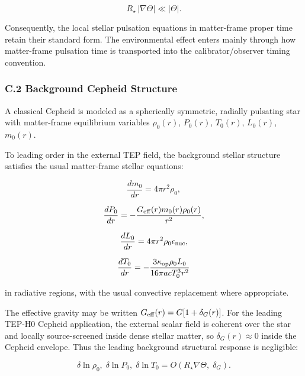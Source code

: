 \documentclass[
]{article}
\begin{document}
\begin{equation}
R_\star\,|\nabla\Theta| \ll |\Theta| .
\end{equation}

Consequently, the local stellar pulsation equations in matter-frame
proper time retain their standard form. The environmental effect enters
mainly through how matter-frame pulsation time is transported into the
calibrator/observer timing convention.

\subsubsection{C.2 Background Cepheid
Structure}\label{c.2-background-cepheid-structure}

A classical Cepheid is modeled as a spherically symmetric, radially
pulsating star with matter-frame equilibrium variables \(\rho_0(r)\),
\(P_0(r)\), \(T_0(r)\), \(L_0(r)\), \(m_0(r)\).

To leading order in the external TEP field, the background stellar
structure satisfies the usual matter-frame stellar equations:

\begin{equation}
\frac{dm_0}{dr} = 4\pi r^2\rho_0 ,
\end{equation}

\begin{equation}
\frac{dP_0}{dr} = -\frac{G_{\rm eff}(r)m_0(r)\rho_0(r)}{r^2} ,
\end{equation}

\begin{equation}
\frac{dL_0}{dr} = 4\pi r^2\rho_0\epsilon_{\rm nuc} ,
\end{equation}

\begin{equation}
\frac{dT_0}{dr} = -\frac{3\kappa_{\rm op}\rho_0 L_0}{16\pi a c T_0^3 r^2}
\end{equation}

in radiative regions, with the usual convective replacement where
appropriate.

The effective gravity may be written
\(G_{\rm eff}(r) = G[1 + \delta_G(r)]\). For the leading TEP-H0 Cepheid
application, the external scalar field is coherent over the star and
locally source-screened inside dense stellar matter, so
\(\delta_G(r) \approx 0\) inside the Cepheid envelope. Thus the leading
background structural response is negligible:

\begin{equation}
\delta\ln\rho_0,\;\delta\ln P_0,\;\delta\ln T_0 = O(R_\star\nabla\Theta,\;\delta_G) .
\end{equation}
\end{document}

